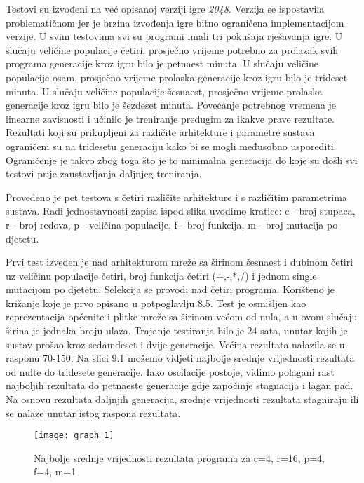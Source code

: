 \quad Testovi su izvođeni na već opisanoj verziji igre \textit{2048}. Verzija se ispostavila problematičnom jer je brzina izvođenja igre bitno ograničena implementacijom verzije. U svim testovima svi su programi imali tri pokušaja rješavanja igre. U slučaju veličine populacije četiri, prosječno vrijeme potrebno za prolazak svih programa generacije kroz igru bilo je petnaest minuta. U slučaju veličine populacije osam, prosječno vrijeme prolaska generacije kroz igru bilo je trideset minuta. U slučaju veličine populacije šesnaest, prosječno vrijeme prolaska generacije kroz igru bilo je šezdeset minuta. Povećanje potrebnog vremena je linearne zavisnosti i učinilo je treniranje predugim za ikakve prave rezultate. Rezultati koji su prikupljeni za različite arhitekture i parametre sustava ograničeni su na tridesetu generaciju kako bi se mogli međusobno usporediti. Ograničenje je takvo zbog toga što je to minimalna generacija do koje su došli svi testovi prije zaustavljanja daljnjeg treniranja. 
\par
Provedeno je pet testova s četiri različite arhitekture i s različitim parametrima sustava. Radi jednostavnosti zapisa ispod slika uvodimo kratice: c - broj stupaca, r - broj redova, p - veličina populacije, f - broj funkcija, m - broj mutacija po djetetu.
 \par
 Prvi test izveden je nad arhitekturom mreže sa širinom šesnaest i dubinom četiri uz veličinu populacije četiri, broj funkcija četiri (+,-,*,/) i jednom single mutacijom po djetetu. Selekcija se provodi nad četiri programa. Korišteno je križanje koje je prvo opisano u potpoglavlju 8.5. Test je osmišljen kao reprezentacija općenite i plitke mreže sa širinom većom od nula, a u ovom slučaju širina je jednaka broju ulaza. Trajanje testiranja bilo je 24 sata, unutar kojih je sustav prošao kroz sedamdeset i dvije generacije. Većina rezultata nalazila se u rasponu 70-150. Na slici 9.1 možemo vidjeti najbolje srednje vrijednosti rezultata od nulte do tridesete generacije. Iako oscilacije postoje, vidimo polagani rast najboljih rezultata do petnaeste generacije gdje započinje stagnacija i lagan pad. Na osnovu rezultata daljnjih generacija, srednje vrijednosti rezultata stagniraju ili se nalaze unutar istog raspona rezultata.
 \begin{figure}[h]
 	\centering
 	\texttt{[image: graph\_1]}
 	\caption{Najbolje srednje vrijednosti rezultata programa za c=4, r=16, p=4, f=4, m=1}
 \end{figure}\newpage
\par
